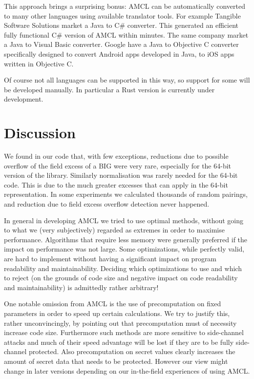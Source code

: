 \documentclass{llncs}
\begin{document}
This approach brings a surprising bonus: AMCL can be automatically converted to many other languages using available translator tools. For example Tangible Software Solutions \cite{tss}
market a Java to C\# converter. This generated an efficient fully functional C\# version of AMCL within minutes. The same company market a Java to Visual Basic converter. 
Google have a Java to Objective C
converter \cite{gol} specifically designed to convert Android apps developed in Java, to iOS apps written in Objective C.

Of course not all languages can be supported in this way, so support for some will be developed manually. In particular a Rust version is currently under development.


\section{Discussion}

We found in our code that, with few exceptions, reductions due to possible overflow of the field excess of a BIG were very rare, especially for the 64-bit version of the library. Similarly 
normalisation was 
rarely needed for the 64-bit code. This is due to the much greater excesses that can apply in the 64-bit representation. In some experiments we calculated thousands of random pairings, 
and reduction due to field excess overflow detection never happened.

In general in developing AMCL we tried to use optimal methods, without going to what we (very subjectively) regarded as extremes in order to maximise performance. 
Algorithms that require less memory were generally preferred if the impact on performance was not large. Some optimizations, while perfectly valid, are hard to 
implement without having a significant impact on program readability and maintainability. Deciding which optimizations to use and which to reject (on the grounds of code size and negative impact on code 
readability and maintainability) is admittedly rather arbitrary!

One notable omission from AMCL is the use of precomputation on fixed parameters in order to speed up certain calculations. We try to justify this, rather unconvincingly, by pointing out 
that precomputation must of necessity increase code size. Furthermore such methods are more sensitive to side-channel attacks and much of their speed advantage will be lost if they are to be 
fully side-channel protected. Also precomputation on secret values clearly increases the amount of secret data that needs to be protected.
However our view might change in later versions depending on our in-the-field experiences of using AMCL.
\end{document}
